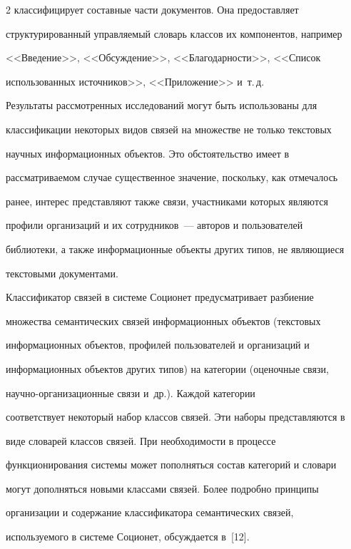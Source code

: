 \begin{multicols}{2}
классифицирует составные части документов. Она предоставляет 


структурированный управляемый словарь классов их компонентов, например 


<<Введение>>, <<Обсуждение>>, <<Благодарности>>, <<Список 


использованных источников>>, <<Приложение>> и~т.\,д.


  


  Результаты рассмотренных исследований могут быть использованы для 


классификации некоторых видов связей на множестве не только текстовых 


научных информационных объектов. Это обстоятельство имеет в 


рассматриваемом случае существенное значение, поскольку, как отмечалось 


ранее, интерес представляют также связи, участниками которых являются 


профили организаций и их сотрудников~--- авторов и пользователей 


библиотеки, а также информационные объекты других типов, не являющиеся 


текстовыми документами. 


  


  Классификатор связей в системе Соционет предусмат\-ри\-ва\-ет разбиение 


множества семантических связей информационных объектов (текстовых 


информационных объектов, профилей пользователей и организаций и 


информационных объектов других типов) на категории (оценочные связи,


   на\-уч\-но-ор\-га\-ни\-за\-ци\-он\-ные связи и~др.). Каждой категории 


соответствует некоторый набор классов связей. Эти наборы представляются в 


виде словарей классов связей. При необходимости в процессе 


функционирования сис\-те\-мы может пополняться состав категорий и словари 


могут дополняться новыми классами связей. Более подробно принципы 


организации и содержание классификатора семантических связей, 


используемого в системе Соционет, обсуждается в~[12].



\end{multicols}
